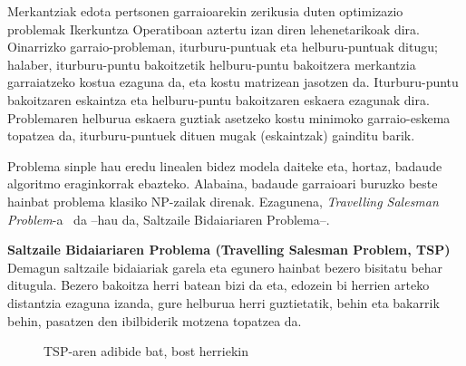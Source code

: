 \documentclass[eu]{ifirak}\usepackage[]{graphicx}\usepackage[]{color}
\begin{document}
Merkantziak edota pertsonen garraioarekin zerikusia duten optimizazio problemak Ikerkuntza Operatiboan aztertu izan diren lehenetarikoak dira. Oinarrizko garraio-probleman, iturburu-puntuak eta helburu-puntuak ditugu; halaber, iturburu-puntu bakoitzetik helburu-puntu bakoitzera merkantzia garraiatzeko kostua ezaguna da, eta kostu matrizean jasotzen da. Iturburu-puntu bakoitzaren eskaintza eta helburu-puntu bakoitzaren eskaera ezagunak dira. Problemaren helburua eskaera guztiak asetzeko kostu minimoko garraio-eskema topatzea da, iturburu-puntuek dituen mugak (eskaintzak) gainditu barik. 

Problema sinple hau eredu linealen bidez modela daiteke eta, hortaz, badaude algoritmo eraginkorrak ebazteko. Alabaina, badaude garraioari buruzko beste hainbat problema klasiko NP-zailak direnak. Ezagunena, \textit{Travelling Salesman Problem}-a~\cite{goldberg1985} da --hau da, Saltzaile Bidaiariaren Problema--. 

\begin{tcolorbox}
\begin{ifexample}{\bf Saltzaile Bidaiariaren Problema (Travelling Salesman Problem, TSP)}
Demagun saltzaile bidaiariak garela eta egunero hainbat bezero bisitatu behar ditugula. Bezero bakoitza herri batean bizi da eta, edozein bi herrien arteko distantzia ezaguna izanda, gure helburua herri guztietatik, behin eta bakarrik behin, pasatzen den ibilbiderik motzena topatzea da.
\end{ifexample}
\end{tcolorbox}

\begin{figure}[t]
\centering
{}
\caption{TSP-aren adibide bat, bost herriekin}
\label{fig:tsp}
\end{figure}
\end{document}
